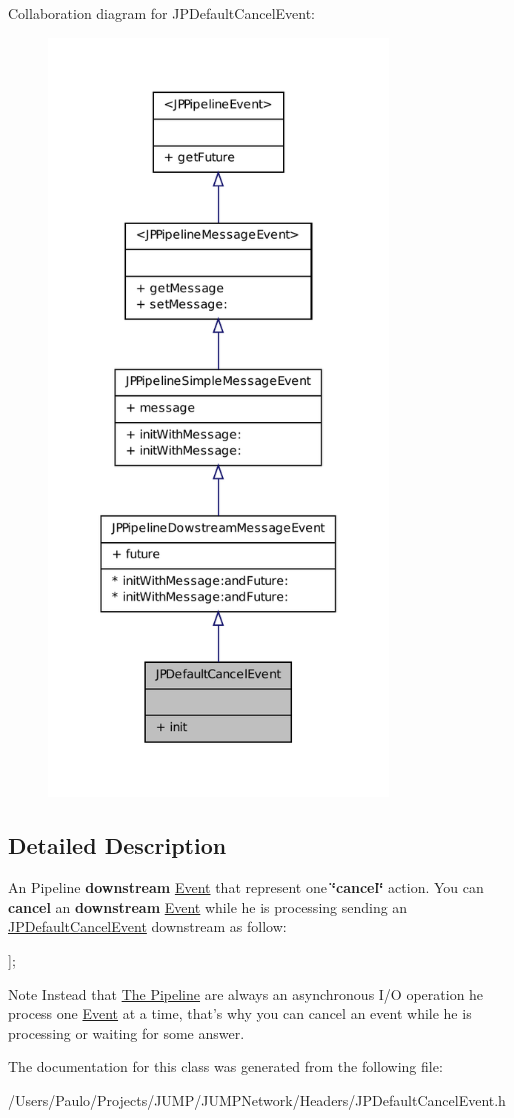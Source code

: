 Collaboration diagram for JPDefaultCancelEvent:\nopagebreak
\begin{figure}[H]
\begin{center}
\leavevmode
\includegraphics[width=256pt]{a00092}
\end{center}
\end{figure}


\subsection{Detailed Description}
An Pipeline {\bfseries downstream} \hyperlink{a00005}{Event} that represent one {\bfseries \char`\"{}cancel\char`\"{}} action. You can {\bfseries cancel} an {\bfseries downstream} \hyperlink{a00005}{Event} while he is processing sending an \hyperlink{a00010}{JPDefaultCancelEvent} downstream as follow: 
\begin{DoxyCode}
 [pipeline sendDownstream:[JPDefaultCancelEvent init]];
\end{DoxyCode}
 \begin{DoxyNote}{Note}
Instead that \hyperlink{a00001}{The Pipeline} are always an asynchronous I/O operation he process one \hyperlink{a00005}{Event} at a time, that's why you can cancel an event while he is processing or waiting for some answer. 
\end{DoxyNote}


The documentation for this class was generated from the following file:\begin{DoxyCompactItemize}
\item 
/Users/Paulo/Projects/JUMP/JUMPNetwork/Headers/JPDefaultCancelEvent.h\end{DoxyCompactItemize}
